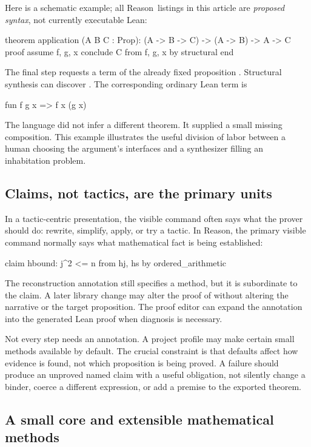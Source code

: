 \documentclass[11pt,a4paper]{article}
\newcommand{\Reason}{\textsf{Reason}}
\newcommand{\code}[1]{\texttt{\detokenize{#1}}}
\theoremstyle{remark}
\begin{document}
Here is a schematic example; all \Reason\ listings in this article are \emph{proposed syntax}, not currently executable Lean:
\begin{Code}
theorem application (A B C : Prop):
    (A -> B -> C) -> (A -> B) -> A -> C
proof
  assume f, g, x
  conclude C from f, g, x by structural
end
\end{Code}
The final step requests a term of the already fixed proposition \code{C}. Structural synthesis can discover \code{f x (g x)}. The corresponding ordinary Lean term is
\begin{Code}
fun f g x => f x (g x)
\end{Code}
The language did not infer a different theorem. It supplied a small missing composition. This example illustrates the useful division of labor between a human choosing the argument's interfaces and a synthesizer filling an inhabitation problem.

\subsection{Claims, not tactics, are the primary units}

In a tactic-centric presentation, the visible command often says what the prover should do: rewrite, simplify, apply, or try a tactic. In \Reason, the primary visible command normally says what mathematical fact is being established:
\begin{Code}
claim hbound: j^2 <= n
  from hj, hs by ordered_arithmetic
\end{Code}
The reconstruction annotation still specifies a method, but it is subordinate to the claim. A later library change may alter the proof of \code{hbound} without altering the narrative or the target proposition. The proof editor can expand the annotation into the generated Lean proof when diagnosis is necessary.

Not every step needs an annotation. A project profile may make certain small methods available by default. The crucial constraint is that defaults affect how evidence is found, not which proposition is being proved. A failure should produce an unproved named claim with a useful obligation, not silently change a binder, coerce a different expression, or add a premise to the exported theorem.

\subsection{A small core and extensible mathematical methods}
\end{document}
